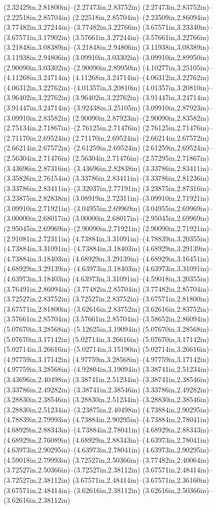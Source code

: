 (2.32429in,2.81800in)--(2.27473in,2.83752in) (2.27473in,2.83752in)--(2.22518in,2.85704in) (2.22518in,2.85704in)--(2.23509in,2.86094in) (3.77482in,3.27244in)--(3.77482in,3.22766in) (3.67571in,3.23340in)--(3.67571in,3.17902in) (3.57661in,3.27244in)--(3.57661in,3.22766in) (3.21848in,3.08389in)--(3.21848in,2.94806in) (3.11938in,3.08389in)--(3.11938in,2.94806in) (3.09910in,3.03302in)--(3.09910in,2.89950in) (2.90090in,3.03302in)--(2.90090in,2.89950in) (4.10277in,3.25105in)--(4.11268in,3.24714in) (4.11268in,3.24714in)--(4.06312in,3.22762in) (4.06312in,3.22762in)--(4.01357in,3.20810in) (4.01357in,3.20810in)--(3.96402in,3.22762in) (3.96402in,3.22762in)--(3.91447in,3.24714in) (3.91447in,3.24714in)--(3.92438in,3.25105in) (3.09910in,2.87923in)--(3.09910in,2.83582in) (2.90090in,2.87923in)--(2.90090in,2.83582in) (2.75134in,2.71867in)--(2.76125in,2.71476in) (2.76125in,2.71476in)--(2.71170in,2.69524in) (2.71170in,2.69524in)--(2.66214in,2.67572in) (2.66214in,2.67572in)--(2.61259in,2.69524in) (2.61259in,2.69524in)--(2.56304in,2.71476in) (2.56304in,2.71476in)--(2.57295in,2.71867in) (3.43696in,2.87316in)--(3.43696in,2.82838in) (3.33786in,2.83411in)--(3.35826in,2.76154in) (3.33786in,2.83411in)--(3.33786in,2.81236in) (3.33786in,2.83411in)--(3.32037in,2.77191in) (3.23875in,2.87316in)--(3.23875in,2.82838in) (3.08919in,2.72311in)--(3.09910in,2.71921in) (3.09910in,2.71921in)--(3.04955in,2.69969in) (3.04955in,2.69969in)--(3.00000in,2.68017in) (3.00000in,2.68017in)--(2.95045in,2.69969in) (2.95045in,2.69969in)--(2.90090in,2.71921in) (2.90090in,2.71921in)--(2.91081in,2.72311in) (4.73884in,3.31091in)--(4.78839in,3.20355in) (4.73884in,3.31091in)--(4.73884in,3.18403in) (4.68929in,3.29139in)--(4.73884in,3.18403in) (4.68929in,3.29139in)--(4.68929in,3.16451in) (4.68929in,3.29139in)--(4.63973in,3.18403in) (4.63973in,3.31091in)--(4.63973in,3.18403in) (4.63973in,3.31091in)--(4.59018in,3.20355in) (3.76491in,2.86094in)--(3.77482in,2.85704in) (3.77482in,2.85704in)--(3.72527in,2.83752in) (3.72527in,2.83752in)--(3.67571in,2.81800in) (3.67571in,2.81800in)--(3.62616in,2.83752in) (3.62616in,2.83752in)--(3.57661in,2.85704in) (3.57661in,2.85704in)--(3.58652in,2.86094in) (5.07670in,3.28568in)--(5.12625in,3.19094in) (5.07670in,3.28568in)--(5.07670in,3.17142in) (5.02714in,3.26616in)--(5.07670in,3.17142in) (5.02714in,3.26616in)--(5.02714in,3.15190in) (5.02714in,3.26616in)--(4.97759in,3.17142in) (4.97759in,3.28568in)--(4.97759in,3.17142in) (4.97759in,3.28568in)--(4.92804in,3.19094in) (3.38741in,2.51234in)--(3.43696in,2.40498in) (3.38741in,2.51234in)--(3.38741in,2.38546in) (3.33786in,2.49282in)--(3.38741in,2.38546in) (3.33786in,2.49282in)--(3.28830in,2.38546in) (3.28830in,2.51234in)--(3.28830in,2.38546in) (3.28830in,2.51234in)--(3.23875in,2.40498in) (4.73884in,2.90295in)--(4.78839in,2.79993in) (4.73884in,2.90295in)--(4.73884in,2.78041in) (4.68929in,2.88343in)--(4.73884in,2.78041in) (4.68929in,2.88343in)--(4.68929in,2.76089in) (4.68929in,2.88343in)--(4.63973in,2.78041in) (4.63973in,2.90295in)--(4.63973in,2.78041in) (4.63973in,2.90295in)--(4.59018in,2.79993in) (3.72527in,2.50366in)--(3.77482in,2.40064in) (3.72527in,2.50366in)--(3.72527in,2.38112in) (3.67571in,2.48414in)--(3.72527in,2.38112in) (3.67571in,2.48414in)--(3.67571in,2.36160in) (3.67571in,2.48414in)--(3.62616in,2.38112in) (3.62616in,2.50366in)--(3.62616in,2.38112in) 